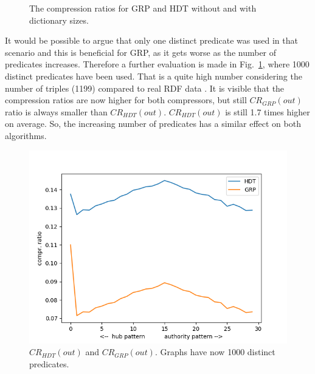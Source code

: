\begin{figure}[h]
	\centering
	\hfill
	\caption{The compression ratios for GRP and HDT without and with dictionary sizes.}
\end{figure}

It would be possible to argue that only one distinct predicate was used in that scenario and this is beneficial for GRP, as it gets worse as the number of predicates increases. Therefore a further evaluation is made in Fig.~\ref{fig:bothwithdict1000predicates}, where 1000 distinct predicates have been used. That is a quite high number considering the number of triples (1199) compared to real RDF data . It is visible that the compression ratios are now higher for both compressors, but still $CR_{GRP}(out)$ ratio is always smaller than $CR_{HDT}(out)$. $CR_{HDT}(out)$ is still 1.7 times higher on average. So, the increasing number of predicates has a similar effect on both algorithms.

\begin{figure}
	\centering
	\includegraphics[width=0.7\linewidth]{figures/GRPvsHDT/bothWithDict1000Predicates}
	\caption{$CR_{HDT}(out)$ and $CR_{GRP}(out)$. Graphs have now 1000 distinct predicates.}
	\label{fig:bothwithdict1000predicates}
\end{figure}

